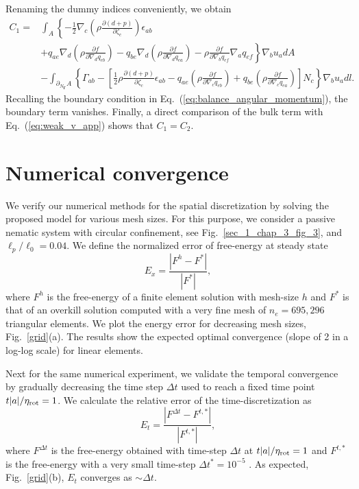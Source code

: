 \documentclass[12pt]{iopart}
\begin{document}
Renaming the dummy indices conveniently, we obtain
\begin{eqnarray}
C_1 = &\int_A \left\{-\frac{1}{2}\nabla_c\left(\rho  \frac{\partial ( d+ p)}{\partial {\zeta}_c}\right) \epsilon_{ab}  \right. \nonumber \\  
& \left. +  {q}_{ae} \nabla_d\left( \rho\frac{\partial f}{\partial \nabla_d q_{eb}}\right)   -    {q}_{be}\nabla_d\left( \rho\frac{\partial f}{\partial \nabla_d q_{ea}}\right)    -  \rho\frac{\partial f}{\partial \nabla_b q_{ef}} \nabla_a{q}_{ef} \right\} \nabla_b {u}_a  dA \nonumber\\
& -\int_{\partial_{N_{\bm{\Gamma}}} A} \left\{ \Gamma_{ab} -  \left[\frac{1}{2} \rho  \frac{\partial ( d+ p)}{\partial {\zeta}_c} \epsilon_{ab} - {q}_{ae} \left( \rho\frac{\partial f}{\partial \nabla_c q_{eb}}\right)   +   {q}_{be}\left( \rho\frac{\partial f}{\partial \nabla_c q_{ea}}\right) \right] N_c \right\}\nabla_b u_a dl.\nonumber
\end{eqnarray}
Recalling the boundary condition in Eq.~(\ref{eq:balance_angular_momentum}), the boundary term vanishes. Finally, a direct comparison of the bulk term with Eq.~(\ref{eq:weak_v_app}) shows that $C_1 = C_2$.

			
			\section{Numerical convergence} \label{appendix_grid}
			
			
			We verify our numerical methods for the spatial discretization by solving the proposed model for various mesh sizes. For this purpose, we consider a passive nematic system with circular confinement, see Fig.~\ref{sec_1_chap_3_fig_3}, and $\ell_p/\ell_0=0.04$. We define the normalized error of free-energy at steady state
			\begin{equation}	
				E_x = \frac{|F^h -F^*|}{|F^*|} , 
			\end{equation}
			where $F^h$ is the free-energy of a finite element solution with mesh-size $h$ and $F^*$ is that of an overkill solution computed with a very fine mesh of $n_e = 695,296$ triangular elements. We plot the energy error for decreasing mesh sizes, Fig.~\ref{grid}(a). The results show the expected optimal convergence (slope of 2 in a log-log scale) for linear elements. 
			
			Next for the same numerical experiment, we validate the temporal convergence by gradually decreasing the
			time step $\Delta t$ used to reach a fixed time point $t|a|/\eta_{\rm rot}=1$. We calculate the relative error of the time-discretization as
			\begin{equation}	
				E_t = \frac{|F^{\Delta t} -F^{t,*}|}{|F^{t,*}|} , 
			\end{equation}
			where $F^{\Delta t}$ is the free-energy obtained with time-step $\Delta t$  at $t|a|/\eta_{\rm rot}=1$ and   $F^{t,*}$ is the free-energy with a very small time-step $\Delta t^* = 10^{-5}$ . As expected,  Fig.~\ref{grid}(b), $E_t$ converges as $\sim \Delta t$.
			
\end{document}
